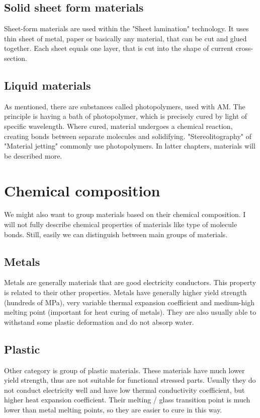 \documentclass[a4paper, twoside, 11pt]{report}
\begin{document}
\subsection{Solid sheet form materials}
Sheet-form materials are used within the "Sheet lamination" technology. It uses thin sheet of metal, paper or basically any material, that can be cut and glued together. Each sheet equals one layer, that is cut into the shape of current cross-section.
\subsection{Liquid materials}
As mentioned, there are substances called photopolymers, used with AM. The principle is having a bath of photopolymer, which is precisely cured by light of specific wavelength. Where cured, material undergoes a chemical reaction, creating bonds between separate molecules and solidifying. "Stereolitography" of "Material jetting" commonly use photopolymers. In latter chapters, materials will be described more.\\
%
%
\section{Chemical composition}
We might also want to group materials based on their chemical composition. I will not fully describe chemical properties of materials like type of molecule bonds. Still, easily we can distinguish between main groups of materials.
\subsection{Metals}
Metals are generally materials that are good electricity conductors. This property is related to their other properties. Metals have generally higher yield strength (hundreds of MPa), very variable thermal expansion coefficient and medium-high melting point (important for heat curing of metals). They are also usually able to withstand some plastic deformation and do not absorp water.
\subsection{Plastic}
Other category is group of plastic materials. These materials have much lower yield strength, thus are not suitable for functional stressed parts. Usually they do not conduct electricity well and have low thermal conductivity coefficient, but higher heat expansion coefficient. Their melting / glass transition point is much lower than metal melting points, so they are easier to cure in this way.
\end{document}

